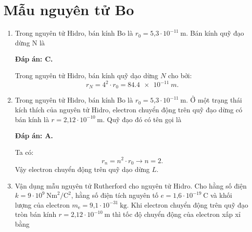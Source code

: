 


\section{Mẫu nguyên tử Bo}
\begin{enumerate}[label=\bfseries Câu \arabic*:]
	\item {} 
		\cauhoi
	{Trong nguyên tử Hidro, bán kính Bo là $r_0=\text{5,3}\cdot 10^{-11}\ \text{m}$. Bán kính quỹ đạo dừng N là
	}
	
	\loigiai
	{		\textbf{Đáp án: C.}
		
Trong nguyên tử Hidro, bán kính quỹ dạo dừng $ N $ cho bởi:
$$
	r_{N} = 4^{2} \cdot r_{0} = \SI{84,4 e-11}{m}.
$$
		
	}
	
	\item {} 
		\cauhoi
	{Trong nguyên tử Hidro, bán kính Bo là $r_0=\text{5,3}\cdot 10^{-11}\ \text{m}$.   Ở một trạng thái kích thích của nguyên tử Hidro, electron chuyển động trên quỹ đạo dừng có bán kính là $r=\text{2,12}\cdot 10^{-10}\ \text{m}$.   Quỹ đạo đó có tên gọi là 
	}
	
	\loigiai
	{		\textbf{Đáp án: A.}
		
Ta có:
$$
	r_{n} = n^{2} \cdot r_{0} \rightarrow n = \num{2}.
$$
Vậy electron chuyển động trên quỹ dạo dừng $ L $.
		
	}
	
	\item {} 
		\cauhoi
	{Vận dụng mẫu nguyên tử Rutherford cho nguyên tử Hidro. Cho hằng số điện $k=9\cdot 10^9\ \text{Nm}^2/\text{C}^2$, hằng số điện tích nguyên tố $e=\text{1,6}\cdot 10^{-19}\ \text{C}$ và khối lượng của electron $m_\text{e}=\text{9,1}\cdot 10^{-31}\ \text{kg}$. Khi electron chuyển động trên quỹ đạo tròn bán kính $r = \text{2,12} \cdot 10^{-10}\ \text{m}$ thì tốc độ chuyển động của electron xấp xỉ bằng
	}
	

\end{enumerate}

